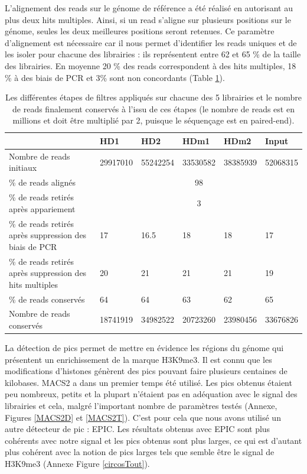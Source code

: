 \documentclass[a4paper,12pt,times]{report}
\newcommand{\scaption}[1]{\caption{\footnotesize{#1}}}
\begin{document}
      L'alignement des reads sur le génome de référence a été réalisé en autorisant au plus deux hits multiples. Ainsi, si un read s'aligne sur plusieurs positions sur le génome, seules les deux meilleures positions seront retenues. Ce paramètre d'alignement est nécessaire car il nous permet d'identifier les reads uniques et de les isoler pour chacune des librairies : ils représentent entre 62 et 65 \% de la taille des librairies. En moyenne 20  \% des reads correspondent à des hits multiples, 18  \%  à  des biais de PCR et  3\% sont non concordants (Table \ref{tab2}).
    \begin{table}[h]
  \begin{tabular}{|p{5cm}|p{2cm}|p{2cm}|p{2cm}|p{2cm}|p{2cm}|}
\hline
  & HD1 & HD2 &  HDm1&  HDm2 & Input\\
\hline
Nombre de reads initiaux & 29917010 &  55242254 & 33530582 & 38385939 & 52068315  \\
\hline
\% de reads alignés & \multicolumn{5}{c|}{98}  \\
\hline
\% de reads retirés après appariement& \multicolumn{5}{c|}{3}  \\
\hline
\% de reads retirés après suppression des biais de PCR & 17 & 16.5 & 18 & 18 & 17  \\
\hline
\% de reads retirés après suppression des hits multiples & 20 & 21 & 21 & 21 & 19  \\
\hline
\% de reads conservés & 64 & 64 & 63 & 62 & 65  \\
\hline
Nombre de reads conservés& 18741919 &34982522 & 20723260 & 23980456 & 33676826  \\
\hline
\end{tabular}

\scaption{Les différentes étapes de filtres appliqués sur chacune des 5 librairies et le nombre de reads finalement conservés à l'issu de ces étapes (le nombre de reads est en millions et doit être multiplié par 2, puisque le séquençage est en paired-end).}
\label{tab2}
\end{table}

La détection de pics permet de mettre en évidence les régions du génome qui présentent un enrichissement de la marque H3K9me3.
 Il est connu que les modifications d'histones génèrent des pics pouvant faire plusieurs centaines de kilobases.
 MACS2 a dans un premier temps été utilisé. Les pics obtenus étaient peu nombreux, petits et  la plupart n'étaient pas en adéquation avec le signal des librairies et cela, malgré l'important nombre de paramètres testés (Annexe, Figures \ref{MACS2D} et \ref{MACS2T}).
C'est pour cela que nous avons utilisé un autre détecteur de pic : EPIC. Les résultats obtenus avec EPIC sont plus cohérents avec notre signal et les pics obtenus sont plus larges, ce qui est d'autant plus cohérent avec la notion de pics larges tels que semble être le signal de H3K9me3 (Annexe Figure \ref{circosTout}).
\end{document}
